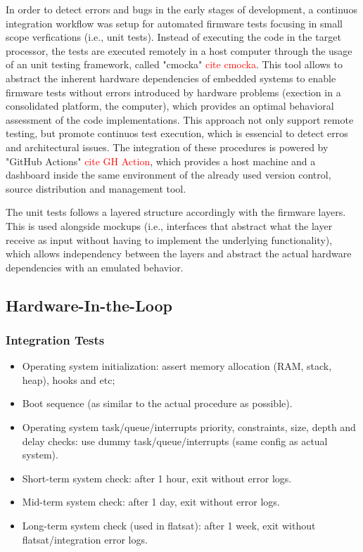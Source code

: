 In order to detect errors and bugs in the early stages of development, a continuos integration workflow was setup for automated firmware tests focusing in small scope verfications (i.e., unit tests). Instead of executing the code in the target processor, the tests are executed remotely in a host computer through the usage of an unit testing framework, called "cmocka" \textcolor{red}{cite cmocka}. This tool allows to abstract the inherent hardware dependencies of embedded systems to enable firmware tests without errors introduced by hardware problems (exection in a consolidated platform, the computer), which provides an optimal behavioral assessment of the code implementations. This approach not only support remote testing, but promote continuos test execution, which is essencial to detect erros and architectural issues. The integration of these procedures is powered by "GitHub Actions" \textcolor{red}{cite GH Action}, which provides a host machine and a dashboard inside the same environment of the already used version control, source distribution and management tool.

The unit tests follows a layered structure accordingly with the firmware layers. This is used alongside mockups (i.e., interfaces that abstract what the layer receive as input without having to implement the underlying functionality), which allows independency between the layers and abstract the actual hardware dependencies with an emulated behavior.


\subsection{Hardware-In-the-Loop}



\subsubsection{Integration Tests}

\begin{itemize} \setlength\itemsep{-0.3em}
    \item Operating system initialization: assert memory allocation (RAM, stack, heap), hooks and etc;
    \item Boot sequence (as similar to the actual procedure as possible).
    \item Operating system task/queue/interrupts priority, constraints, size, depth and delay checks: use dummy task/queue/interrupts (same config as actual system).
    \item Short-term system check: after 1 hour, exit without error logs.
    \item Mid-term system check: after 1 day, exit without error logs.
    \item Long-term system check (used in flatsat): after 1 week, exit without flatsat/integration error logs.
\end{itemize}

